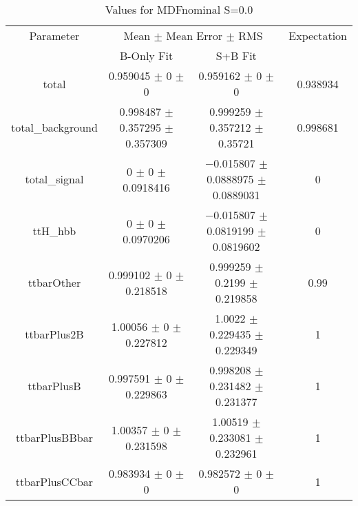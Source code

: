 \begin{table}
\centering
\caption{Values for MDFnominal S=0.0}
\begin{tabular}{cccc}
\toprule
Parameter & \multicolumn{2}{c}{Mean $\pm$ Mean Error $\pm$ RMS} & Expectation\\
 & B-Only Fit & S+B Fit & \\
\midrule
total & \num{0.959045} $\pm$ \num{0} $\pm$ \num{0} & \num{0.959162} $\pm$ \num{0} $\pm$ \num{0} & \num{0.938934}\\
total\_background & \num{0.998487} $\pm$ \num{0.357295} $\pm$ \num{0.357309} & \num{0.999259} $\pm$ \num{0.357212} $\pm$ \num{0.35721} & \num{0.998681}\\
total\_signal & \num{0} $\pm$ \num{0} $\pm$ \num{0.0918416} & \num{-0.015807} $\pm$ \num{0.0888975} $\pm$ \num{0.0889031} & \num{0}\\
ttH\_hbb & \num{0} $\pm$ \num{0} $\pm$ \num{0.0970206} & \num{-0.015807} $\pm$ \num{0.0819199} $\pm$ \num{0.0819602} & \num{0}\\
ttbarOther & \num{0.999102} $\pm$ \num{0} $\pm$ \num{0.218518} & \num{0.999259} $\pm$ \num{0.2199} $\pm$ \num{0.219858} & \num{0.99}\\
ttbarPlus2B & \num{1.00056} $\pm$ \num{0} $\pm$ \num{0.227812} & \num{1.0022} $\pm$ \num{0.229435} $\pm$ \num{0.229349} & \num{1}\\
ttbarPlusB & \num{0.997591} $\pm$ \num{0} $\pm$ \num{0.229863} & \num{0.998208} $\pm$ \num{0.231482} $\pm$ \num{0.231377} & \num{1}\\
ttbarPlusBBbar & \num{1.00357} $\pm$ \num{0} $\pm$ \num{0.231598} & \num{1.00519} $\pm$ \num{0.233081} $\pm$ \num{0.232961} & \num{1}\\
ttbarPlusCCbar & \num{0.983934} $\pm$ \num{0} $\pm$ \num{0} & \num{0.982572} $\pm$ \num{0} $\pm$ \num{0} & \num{1}\\
\bottomrule
\end{tabular}
\end{table}